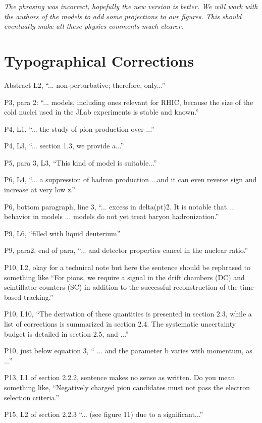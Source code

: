 \documentclass[12pt]{article}
\begin{document}
{\it The phrasing was incorrect, hopefully the new version is better. We will work with 
the authors of the models to add some projections to our figures. This should eventually
make all these physics comments much clearer.} \\

\section{Typographical Corrections}

Abstract L2, “... non-perturbative; therefore, only...”

P3, para 2:  “... models, including ones relevant for RHIC, because the size of the cold nuclei 
used in the JLab experiments is stable and known.”

P4, L1, “... the study of pion production over ...”

P4, L3, “... section 1.3, we provide a...”

P5, para 3, L3, “This kind of model is suitable...”

P6, L4, “... a suppression of hadron production ...and it can even reverse sign and increase at 
very low z.”

P6, bottom paragraph, line 3, “... excess in delta(pt)\^2.  It is notable that ... behavior in models 
... models do not yet treat baryon hadronization.”

P9, L6, “filled with liquid deuterium”

P9, para2, end of para, “... and detector properties cancel in the nuclear ratio.”

P10, L2, okay for a technical note but here the sentence should be rephrased to something like 
“For pions, we require a signal in the drift chambers (DC) and scintillator counters (SC) in 
addition to the successful reconstruction of the time-based tracking.”

P10, L10, “The derivation of these quantities is presented in section 2.3, while a list of 
corrections  is summarized in section 2.4.  The systematic uncertainty budget is detailed in 
section 2.5, and ...”

P10, just below equation 3, “ ... and the parameter b varies with momentum, as ...”

P13, L1 of section 2.2.2, sentence makes no sense as written. Do you mean something like, 
“Negatively charged pion candidates must not pass the electron selection criteria.”

P15, L2 of section 2.2.3 “... (see figure 11) due to a significant...”
\end{document}
